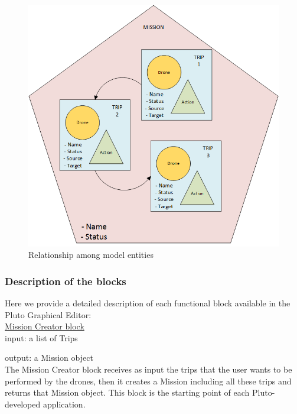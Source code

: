 \newpage

\begin{figure}[htb]
  \centering
  \includegraphics[width=\linewidth]
  {pictures/EntityRelationship.png}
  \caption{Relationship among model entities}
  \label{fig:EntityRelationship}
\end{figure}


\subsubsection {Description of the blocks}\label{blocks}

Here we provide a detailed description of each functional block available in the Pluto Graphical Editor:
\\

\underline{Mission Creator block}
\\

input: a list of Trips

output: a Mission object
\\

The Mission Creator block receives as input the trips that the user wants to be performed by the drones, then it creates a Mission including all these trips and returns that Mission object.
This block is the starting point of each Pluto-developed application.
\\



